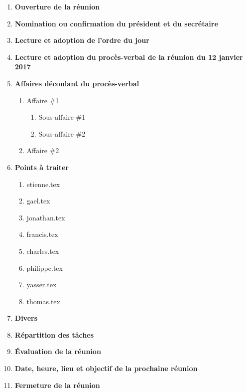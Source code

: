 \documentclass[12pt]{../ULojpv}
\begin{document}
\entete
\begin{enumerate}
   \item \textbf{Ouverture de la réunion}
   \item \textbf{Nomination ou confirmation du président et du secrétaire}
   \item \textbf{Lecture et adoption de l'ordre du jour}
   \item \textbf{Lecture et adoption du procès-verbal de la réunion du 12 janvier 2017}
   \item \textbf{Affaires découlant du procès-verbal}
      \begin{enumerate}
         \item Affaire \#1
            \begin{enumerate}
               \item Sous-affaire \#1
               \item Sous-affaire \#2
            \end{enumerate}
         \item Affaire \#2
      \end{enumerate}
   \item \textbf{Points à traiter}
   \begin{enumerate}
      \item {etienne.tex} 
      \item {gael.tex} 
      \item {jonathan.tex} 
      \item {francis.tex} 
      \item {charles.tex} 
      \item {philippe.tex} 
      \item {yasser.tex} 
      \item {thomas.tex} 
   \end{enumerate}
   \item \textbf{Divers}
   \item \textbf{Répartition des tâches}
   \item \textbf{Évaluation de la réunion}
   \item \textbf{Date, heure, lieu et objectif de la prochaine réunion}
   \item \textbf{Fermeture de la réunion}
\end{enumerate}
\end{document}
